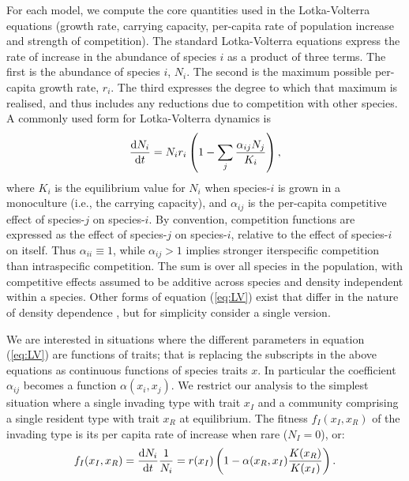 \documentclass[a4paper,11pt]{article}
\begin{document}
For each model, we compute the core quantities used in the
Lotka-Volterra equations (growth rate, carrying capacity, per-capita
rate of population increase and strength of competition).  The
standard Lotka-Volterra equations express the rate of increase in the
abundance of species $i$ as a product of three terms.
%
The first is the abundance of species $i$, $N_i$.
%
The second is the maximum possible per-capita growth rate, $r_i$. The
third expresses the degree to which that maximum is realised, and
thus includes any reductions due to competition with other species. A
commonly used form for Lotka-Volterra dynamics is
%
\begin{equation}
\label{eq:LV}
\frac{\mathrm{d} N_i}{\mathrm{d} t} =
N_i r_i \left(1 - \sum_j \frac{\alpha_{ij} N_j}{K_i}\right),
\end{equation}
%
where $K_i$ is the equilibrium value for $N_i$ when species-$i$ is
grown in a monoculture (i.e., the carrying capacity), and
$\alpha_{ij}$ is the per-capita competitive effect of species-$j$ on
species-$i$.  By convention, competition functions are expressed as
the effect of species-$j$ on species-$i$, relative to the effect of
species-$i$ on itself. Thus $\alpha_{ii}\equiv 1$, while $\alpha_{ij}
>
1$ implies stronger iterspecific competition than intraspecific
competition.  The sum is over all species in the population, with
competitive effects assumed to be additive across species and density
independent within a species.
%
Other forms of equation (\ref{eq:LV}) exist that differ in the nature
of density dependence \citep[e.g.][]{Leimar-2013}, but for simplicity
consider a single version.

We are interested in situations where the different parameters in
equation (\ref{eq:LV}) are functions of traits; that is replacing the
subscripts in the above equations as continuous functions of species
traits $x$.  In particular the coefficient $\alpha_{ij}$ becomes a
function $\alpha(x_i, x_j)$.
%
We restrict our analysis to the simplest situation where a single
invading type with trait $x_I$ and a community comprising a single
resident type with trait $x_R$ at equilibrium.  The fitness $f_I(x_I,
x_R)$ of the invading type is its per capita rate of increase when
rare ($N_I = 0$), or:
%
\begin{equation}
  \label{eq:LVi}
   f_I(x_I, x_R) = \frac{\mathrm{d} N_i}{\mathrm{d} t} \frac{1}{N_i} =
    r(x_I)\left(1 - \alpha(x_R, x_I) \frac{K(x_R)}{K(x_I)}\right).
\end{equation}
%
\end{document}
